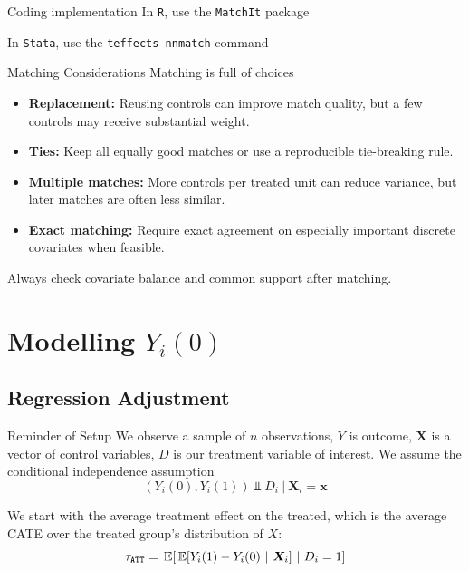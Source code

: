 \documentclass[aspectratio=169,t,11pt,table]{beamer}
\begin{document}
\begin{frame}{Coding implementation}
  In \texttt{R}, use the \texttt{MatchIt} package

  \bigskip
  In \texttt{Stata}, use the \texttt{teffects nnmatch} command 
\end{frame}

\begin{frame}{Matching Considerations}
  Matching is full of choices
  \begin{itemize}
    \item \textbf{Replacement:} Reusing controls can improve match quality, but a few controls may receive substantial weight.
    \item \textbf{Ties:} Keep all equally good matches or use a reproducible tie-breaking rule.
    \item \textbf{Multiple matches:} More controls per treated unit can reduce variance, but later matches are often less similar.
    \item \textbf{Exact matching:} Require exact agreement on especially important discrete covariates when feasible.
  \end{itemize}

  \bigskip
  Always check covariate balance and common support after matching.
\end{frame}



\section{Modelling $Y_i(0)$}
  
\subsection{Regression Adjustment}

\begin{frame}{Reminder of Setup}
  We observe a sample of $n$ observations, $Y$ is outcome, $\bm{X}$ is a vector of control variables, $D$ is our treatment variable of interest. We assume the conditional independence assumption
  $$
    (Y_{i}(0), Y_{i}(1)) \Perp D_i \ \vert \ \bm{X}_i = \bm{x}
  $$

  \pause
  \bigskip
  We start with the average treatment effect on the treated, which is the average CATE over the treated group's distribution of $X$:
  $$
    \tau_{\texttt{ATT}} = \expec{\expec{Y_i(1) - Y_i(0)}{\bm{X}_i}}{D_i = 1}
  $$
\end{frame}
\end{document}
